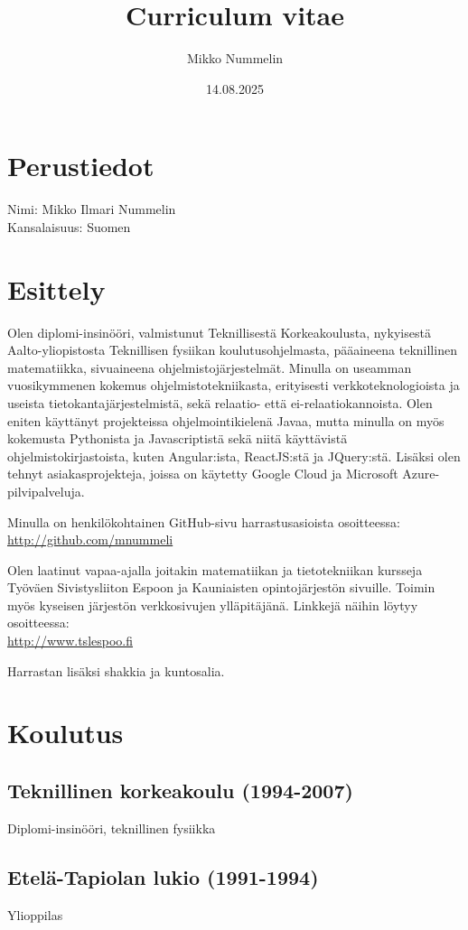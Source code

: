 \documentclass[a4paper,12pt]{article}
\title{Curriculum vitae}
\author{Mikko Nummelin}
\date{14.08.2025}
\begin{document}
\maketitle
\section*{Perustiedot}
Nimi: Mikko Ilmari Nummelin \\
Kansalaisuus: Suomen
\section*{Esittely}

Olen diplomi-insinööri, valmistunut Teknillisestä Korkeakoulusta, nykyisestä Aalto-yliopistosta Teknillisen fysiikan koulutusohjelmasta, pääaineena teknillinen matematiikka, sivuaineena ohjelmistojärjestelmät. Minulla on useamman
vuosikymmenen kokemus ohjelmistotekniikasta, erityisesti verkkoteknologioista ja useista tietokantajärjestelmistä, sekä relaatio- että ei-relaatiokannoista. Olen eniten käyttänyt projekteissa ohjelmointikielenä Javaa, mutta minulla on myös kokemusta Pythonista ja Javascriptistä sekä niitä käyttävistä ohjelmistokirjastoista, kuten Angular:ista, ReactJS:stä ja JQuery:stä. Lisäksi olen tehnyt
asiakasprojekteja, joissa on käytetty Google Cloud ja Microsoft Azure-pilvipalveluja.

Minulla on henkilökohtainen GitHub-sivu harrastusasioista osoitteessa:\\
\href{http://github.com/mnummeli}{http://github.com/mnummeli}

Olen laatinut vapaa-ajalla joitakin matematiikan ja tietotekniikan kursseja Työväen Sivistysliiton Espoon ja Kauniaisten opintojärjestön sivuille. Toimin myös kyseisen järjestön verkkosivujen ylläpitäjänä. Linkkejä näihin löytyy osoitteessa:\\
\href{http://www.tslespoo.fi}{http://www.tslespoo.fi}

Harrastan lisäksi shakkia ja kuntosalia.
\section*{Koulutus}
\subsection*{Teknillinen korkeakoulu (1994-2007)}
Diplomi-insinööri, teknillinen fysiikka
\subsection*{Etelä-Tapiolan lukio (1991-1994)}
Ylioppilas
\end{document}

